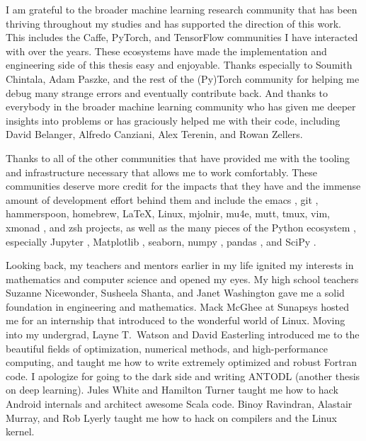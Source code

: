 \documentclass[12pt]{cmuthesis}
\begin{document}
\begin{acknowledgments}
  I am grateful to the broader machine learning research community
  that has been thriving throughout my studies and has
  supported the direction of this work.
  This includes the Caffe, PyTorch, and TensorFlow communities
  I have interacted with over the years.
  These ecosystems have made the implementation and engineering
  side of this thesis easy and enjoyable.
  Thanks especially to Soumith Chintala, Adam Paszke, and the rest
  of the (Py)Torch community for helping me debug many strange
  errors and eventually contribute back.
  And thanks to everybody in the broader machine learning community
  who has given me deeper insights into problems or has graciously
  helped me with their code, including
  David Belanger,
  Alfredo Canziani,
  Alex Terenin, and
  Rowan Zellers.

  Thanks to all of the other communities that have provided me
  with the tooling and infrastructure necessary that allows
  me to work comfortably. These communities deserve more credit
  for the impacts that they have and the immense amount of
  development effort behind them and include the
  emacs \citep{stallman1981emacs},
  git \citep{torvalds2005git},
  hammerspoon,
  homebrew,
  \LaTeX \citep{lamport1994latex},
  Linux,
  mjolnir,
  mu4e,
  mutt,
  tmux,
  vim,
  xmonad \citep{stewart2007xmonad}, and
  zsh projects,
  as well as the many pieces of the Python ecosystem
  \citep{van1995python,oliphant2007python}, especially
  Jupyter \citep{kluyver2016jupyter},
  Matplotlib \citep{hunter2007matplotlib},
  seaborn,
  numpy \citep{van2011numpy},
  pandas \citep{mckinney2012python}, and
  SciPy \citep{jones2014scipy}.

  Looking back, my teachers and mentors earlier in my life
  ignited my interests in mathematics and computer science
  and opened my eyes.
  My high school teachers
  Suzanne Nicewonder,
  Susheela Shanta, and
  Janet Washington gave me a solid foundation
  in engineering and mathematics.
  Mack McGhee at Sunapsys hosted me for an
  internship that introduced to the wonderful
  world of Linux.
  Moving into my undergrad,
  Layne T.~Watson and David Easterling
  introduced me to the beautiful fields
  of optimization, numerical methods, and
  high-performance computing, and taught me how to
  write extremely optimized and robust Fortran code.
  I apologize for going to the dark side and writing
  ANTODL (another thesis on deep learning).
  Jules White and Hamilton Turner taught me how
  to hack Android internals and architect awesome Scala code.
  Binoy Ravindran, Alastair Murray, and Rob Lyerly
  taught me how to hack on compilers
  and the Linux kernel.


\end{acknowledgments}
\end{document}
